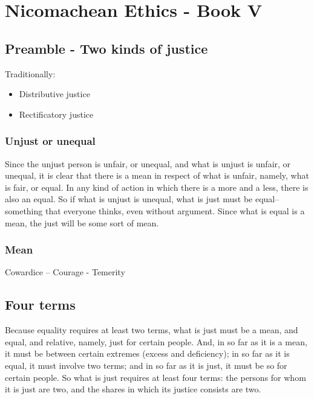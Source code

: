 \section{Nicomachean Ethics - Book V}

            \subsection{Preamble - Two kinds of justice}

                Traditionally:

                    \begin{itemize}
                        \item Distributive justice
                        \item Rectificatory justice
                    \end{itemize}

                \subsubsection{Unjust or unequal}

                    Since the unjust person is unfair, or unequal, and what is unjust is unfair, or unequal, it is clear that there is a mean in respect of what is unfair, namely, what is fair, or equal. In any kind of action in which there is a more and a less, there is also an equal. So if what is unjust is unequal, what is just must be equal– something that everyone thinks, even without argument. Since what is equal is a mean, the just will be some sort of mean.

                \subsubsection{Mean}

                    Cowardice – Courage - Temerity

            \subsection{Four terms}

                Because equality requires at least two terms, what is just must be a mean, and equal, and relative, namely, just for certain people. And, in so far as it is a mean, it must be between certain extremes (excess and deficiency); in so far as it is equal, it must involve two terms; and in so far as it is just, it must be so for certain people. So what is just requires at least four terms: the persons for whom it is just are two, and the shares in which its justice consists are two.

